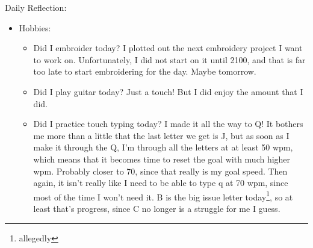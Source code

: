 \documentclass[12pt]{article}[titlepage]
\newcommand{\1}{\={a}}
\newcommand{\2}{\={e}}
\newcommand{\3}{\={\i}}
\newcommand{\4}{\=o}
\newcommand{\5}{\=u}
\newcommand{\6}{\={A}}
\renewcommand{\,}{\textsuperscript{,}}
\begin{document}
Daily Reflection:
\begin{itemize}
\item Hobbies:
\begin{itemize}
\item Did I embroider today? I plotted out the next embroidery project I want to work on. Unfortunately, I did not start on it until 2100, and that is far too late to start embroidering for the day. Maybe tomorrow.
\item Did I play guitar today? Just a touch! But I did enjoy the amount that I did.
\item Did I practice touch typing today? I made it all the way to Q! It bothers me more than a little that the last letter we get is J, but as soon as I make it through the Q, I'm through all the letters at at least 50 wpm, which means that it becomes time to reset the goal with much higher wpm. Probably closer to 70, since that really is my goal speed. Then again, it isn't really like I need to be able to type q at 70 wpm, since most of the time I won't need it. B is the big issue letter today\footnote{allegedly}, so at least that's progress, since C no longer is a struggle for me I guess. 


\end{itemize}
\end{itemize}
\end{document}
